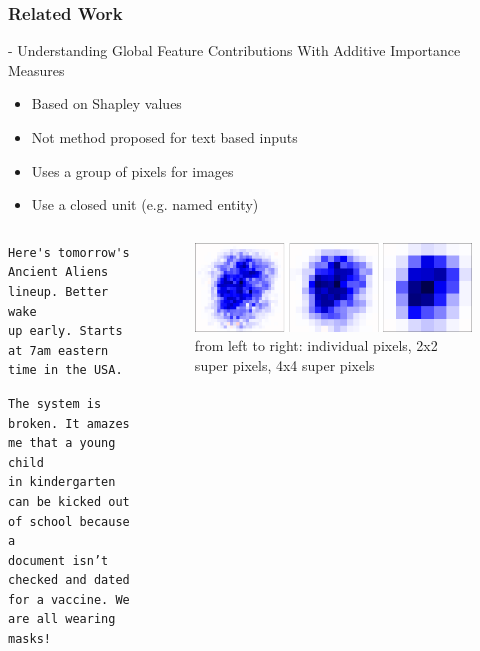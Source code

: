\documentclass[notes]{tum-presentation}
\begin{document}
\begin{frame}[fragile]
  \frametitle{Related Work}
  \citet{NEURIPS2020_c7bf0b7c} - Understanding Global Feature Contributions With Additive Importance Measures 
    
\begin{itemize}
  \item Based on Shapley values
  \item Not method proposed for text based inputs
  \item Uses a group of pixels for images
  \item Use a closed unit (e.g. named entity)
\end{itemize}
\pause
  \begin{columns}
  \begin{column}{.5\textwidth}
\begin{verbatim}
Here's tomorrow's Ancient Aliens lineup. Better wake
up early. Starts at 7am eastern time in the USA.
\end{verbatim}
\vspace*{.5cm}
\begin{verbatim}
The system is broken. It amazes me that a young child 
in kindergarten can be kicked out of school because a 
document isn’t checked and dated for a vaccine. We 
are all wearing masks!
\end{verbatim}
  \end{column}
  \begin{column}{.5\textwidth}
    \begin{figure}[tb]
      \centering
      \includegraphics[width=\columnwidth]{pictures/sage-pixels.png}
      \caption{from left to right: individual pixels, 2x2 super pixels, 4x4 super pixels}
      \label{fig:figure1}
    \end{figure}
  \end{column}
  \end{columns}
\end{frame}
\end{document}
